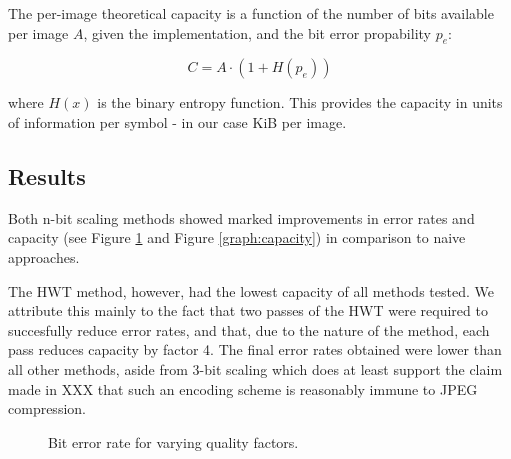 The per-image theoretical capacity is a function of the number of bits available per image $A$, given the implementation, and the bit error propability $p_e$:

\begin{equation}
    C = A \cdot (1 + H(p_e))
\end{equation}

where $H(x)$ is the binary entropy function. This provides the capacity in units of information per symbol - in our case KiB per image.

\subsection{Results}

Both n-bit scaling methods showed marked improvements in error rates and capacity (see Figure \ref{graph:ber} and Figure \ref{graph:capacity}) in comparison to naive approaches.

The HWT method, however, had the lowest capacity of all methods tested. We attribute this mainly to the fact that two passes of the HWT were required to succesfully reduce error rates, and that, due to the nature of the method, each pass reduces capacity by factor 4. The final error rates obtained were lower than all other methods, aside from 3-bit scaling which does at least support the claim made in XXX that such an encoding scheme is reasonably immune to JPEG compression.


\begin{figure}[tbph]
  \begin{center}
    \caption{Bit error rate for varying quality factors.}
    \label{graph:ber}
  \end{center}
\end{figure}

